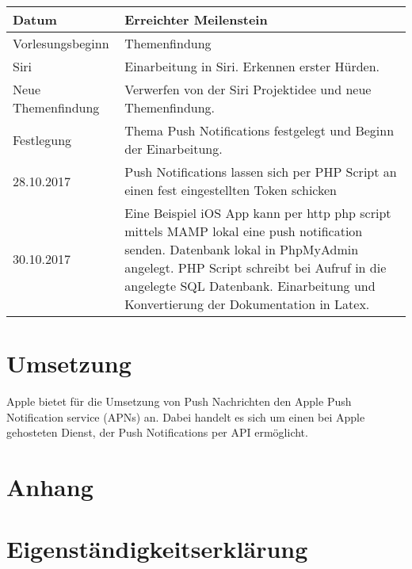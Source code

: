 \documentclass{article}
\begin{document}
\noindent%
\begin{tabularx}{\textwidth}{p{}X}
\textbf{Datum} & \textbf{Erreichter Meilenstein}  \\ \hline 

Vorlesungsbeginn & Themenfindung \\ \hline

Siri & Einarbeitung in Siri. Erkennen erster Hürden. \\ \hline

Neue Themenfindung & Verwerfen von der Siri Projektidee und neue Themenfindung. \\ \hline

Festlegung & Thema Push Notifications festgelegt und Beginn der Einarbeitung. \\ \hline

28.10.2017 & Push Notifications lassen sich per PHP Script an einen fest eingestellten Token schicken \\ \hline

30.10.2017 & Eine Beispiel iOS App kann per http php script mittels MAMP lokal eine push notification senden. \newline
Datenbank lokal in PhpMyAdmin angelegt. \newline
PHP Script schreibt bei Aufruf in die angelegte SQL Datenbank. \newline
Einarbeitung und Konvertierung der Dokumentation in Latex.
 \\ \hline
 
 
 

\end{tabularx}

\newpage
\section{Umsetzung}

Apple bietet für die Umsetzung von Push Nachrichten den Apple Push Notification service (APNs) an. Dabei handelt es sich um einen bei Apple gehosteten Dienst, der Push Notifications per API ermöglicht.

\newpage
\section{Anhang}
\begin{figure}[h]
\end{figure}

\newpage
\section{Eigenständigkeitserklärung}
\end{document}
